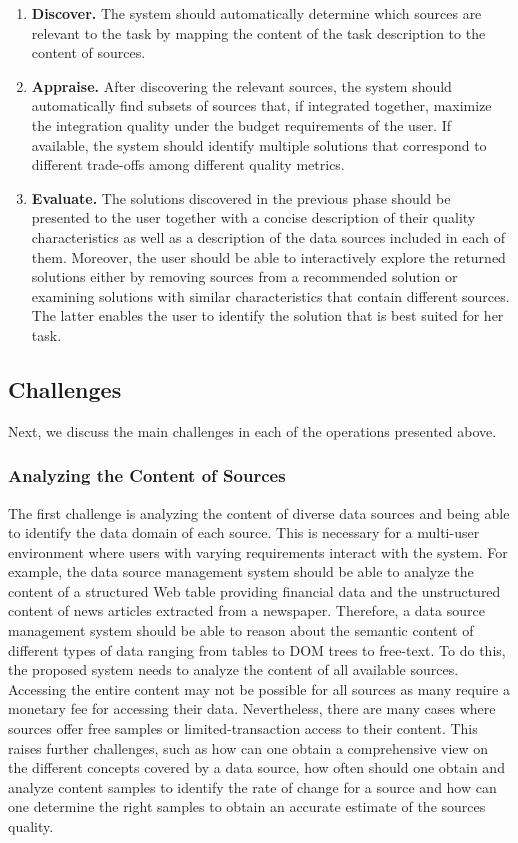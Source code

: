 \documentclass{sig-alternate}
\begin{document}
\begin{enumerate}
\item {\bf Discover.} The system should automatically determine which sources are relevant to the task by mapping the content of the task description to the content of sources.
\item {\bf Appraise.} After discovering the relevant sources, the system should automatically find subsets of sources that, if integrated together, maximize the integration quality under the budget requirements of the user. If available, the system should identify multiple solutions that correspond to different trade-offs among different quality metrics. 
\item {\bf Evaluate.} The solutions discovered in the previous phase should be presented to the user together with a concise description of their quality characteristics as well as a description of the data sources included in each of them. Moreover, the user should be able to interactively explore the returned solutions either by removing sources from a recommended solution or examining solutions with similar characteristics that contain different sources. The latter enables the user to identify the solution that is best suited for her task.
\end{enumerate}

\subsection{Challenges}
Next, we discuss the main challenges in each of the operations presented above. 
\subsubsection{Analyzing the Content of Sources}
\label{sec:content}
The first challenge is analyzing the content of diverse data sources and being able to identify the data domain of each source. This is necessary for a multi-user environment where users with varying requirements interact with the system. For example, the data source management system should be able to analyze the content of a structured Web table providing financial data and the unstructured content of news articles extracted from a newspaper. Therefore, a data source management system should be able to reason about the semantic content of different types of data ranging from tables to DOM trees to free-text. To do this, the proposed system needs to analyze the content of all available sources. Accessing the entire content may not be possible for all sources as many require a monetary fee for accessing their data. Nevertheless, there are many cases where sources offer free samples or limited-transaction access to their content. This raises further challenges, such as how can one obtain a comprehensive view on the different concepts covered by a data source, how often should one obtain and analyze content samples to identify the rate of change for a source and how can one determine the right samples to obtain an accurate estimate of the sources quality.
\end{document}

